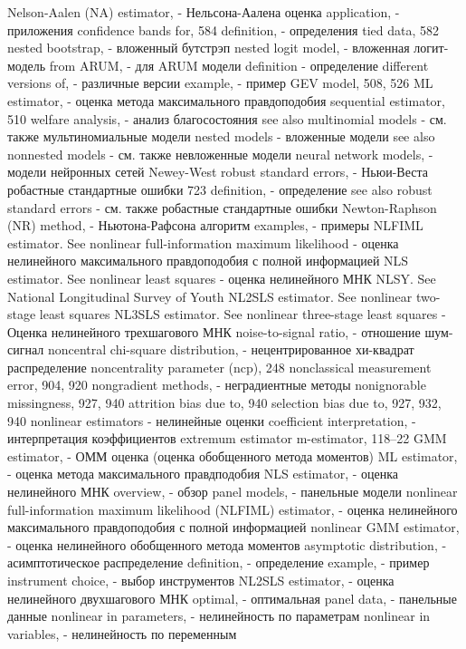 Nelson-Aalen (NA) estimator, - Нельсона-Аалена оценка
application, - приложения
confidence bands for, 584 
definition, - определения
tied data, 582
nested bootstrap, - вложенный бутстрэп
nested logit model, - вложенная логит-модель
from ARUM, - для ARUM модели
definition - определение
different versions of, - различные версии 
example, - пример
GEV model, 508, 526 
ML estimator, - оценка метода максимального правдоподобия
sequential estimator, 510 
welfare analysis, - анализ благосостояния
see also multinomial models  - см. также мультиномиальные модели
nested models - вложенные модели
see also nonnested models - см. также невложенные модели
neural network models, - модели нейронных сетей
Newey-West robust standard errors, - Ньюи-Веста робастные стандартные ошибки
723
definition, - определение
see also robust standard errors - см. также робастные стандартные ошибки
Newton-Raphson (NR) method, - Ньютона-Рафсона алгоритм
examples, - примеры
NLFIML estimator. See nonlinear full-information maximum likelihood - оценка нелинейного максимального правдоподобия с полной информацией
NLS estimator. See nonlinear least squares - оценка нелинейного МНК
NLSY. See National Longitudinal Survey of Youth NL2SLS estimator. See nonlinear two-stage least
squares
NL3SLS estimator. See nonlinear three-stage least squares - Оценка нелинейного трехшагового МНК
noise-to-signal ratio, - отношение шум-сигнал
noncentral chi-square distribution, - нецентрированное хи-квадрат распределение
noncentrality parameter (ncp), 248 nonclassical measurement error, 904, 920 
nongradient methods, - неградиентные методы
nonignorable missingness, 927, 940
attrition bias due to, 940
selection bias due to, 927, 932, 940 
nonlinear estimators - нелинейные оценки
coefficient interpretation, - интерпретация коэффициентов
extremum estimator m-estimator, 118–22
GMM estimator, - ОММ оценка (оценка обобщенного метода моментов)
ML estimator, - оценка метода максимального правдподобия
NLS estimator, - оценка нелинейного МНК
overview, - обзор
panel models, - панельные модели
nonlinear full-information maximum likelihood (NLFIML) estimator, - оценка нелинейного максимального правдоподобия с полной информацией
nonlinear GMM estimator, - оценка нелинейного обобщенного метода моментов
asymptotic distribution, - асимптотическое распределение
definition, - определение
example, - пример 
instrument choice, - выбор инструментов 
NL2SLS estimator, - оценка нелинейного двухшагового МНК
optimal, - оптимальная
panel data, - панельные данные
nonlinear in parameters, - нелинейность по параметрам
nonlinear in variables, - нелинейность по переменным
